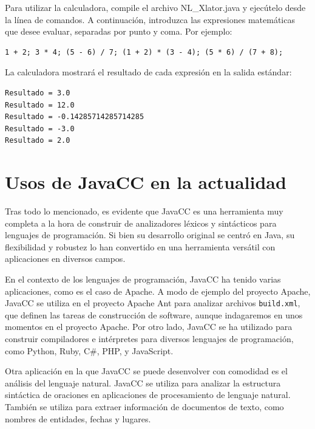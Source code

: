 
Para utilizar la calculadora, compile el archivo NL\_Xlator.java y ejecútelo desde la línea de comandos. A continuación, introduzca las expresiones matemáticas que desee evaluar, separadas por punto y coma. Por ejemplo:

\begin{lstlisting}
1 + 2; 3 * 4; (5 - 6) / 7; (1 + 2) * (3 - 4); (5 * 6) / (7 + 8);
\end{lstlisting}

La calculadora mostrará el resultado de cada expresión en la salida estándar:

\begin{lstlisting}
Resultado = 3.0
Resultado = 12.0
Resultado = -0.14285714285714285
Resultado = -3.0
Resultado = 2.0
\end{lstlisting}

\section{Usos de JavaCC en la actualidad}

\noindent Tras todo lo mencionado, es evidente que JavaCC es una herramienta muy completa a la hora de construir de analizadores léxicos y sintácticos para lenguajes de programación. Si bien su desarrollo original se centró en Java, su flexibilidad y robustez lo han convertido en una herramienta versátil con aplicaciones en diversos campos.

En el contexto de los lenguajes de programación, JavaCC ha tenido varias aplicaciones, como es el caso de Apache. A modo de ejemplo del proyecto Apache, JavaCC se utiliza en el proyecto Apache Ant para analizar archivos  \lstinline|build.xml|, que definen las tareas de construcción de software\cite{apache}, aunque indagaremos en unos momentos en el proyecto Apache. Por otro lado, JavaCC se ha utilizado para construir compiladores e intérpretes para diversos lenguajes de programación, como Python, Ruby, C\#, PHP, y JavaScript\cite{javaccc++preprocessor}.

Otra aplicación en la que JavaCC se puede desenvolver con comodidad es el análisis del lenguaje natural. JavaCC se utiliza para analizar la estructura sintáctica de oraciones en aplicaciones de procesamiento de lenguaje natural\cite{languageprocessing}. También se utiliza para extraer información de documentos de texto, como nombres de entidades, fechas y lugares.


